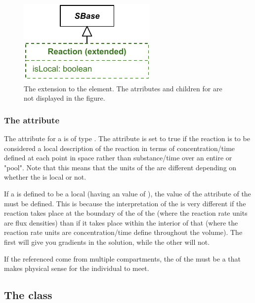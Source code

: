 \begin{figure}[ht]
  \includegraphics{figs/extended-reaction-uml}
  \caption{The extension to the \Reaction element. The \sbmlthreecore atrributes and children for \Reaction are not displayed in the figure.}
  \label{reaction-uml}
\end{figure}

\subsubsection{The \fixttspace{} attribute}
The  attribute for a \Reaction is of type . The attribute is set to true if the reaction is to be considered a local description of the reaction in terms of concentration/time defined at each point in space rather than substance/time over an entire \Compartment or "pool".  Note that this means that the units of the \KineticLaw are different depending on whether the \Reaction is local or not.

If a \Reaction is defined to be a local (having an  value of ), the value of the  attribute of the \Reaction must be defined.  This is because the interpretation of the \Reaction is very different if the reaction takes place at the boundary of the \Compartment of the \Species (where the reaction rate units are flux densities) than if it takes place within the interior of that \Compartment (where the reaction rate units are concentration/time define throughout the volume).  The first will give you gradients in the solution, while the other will not.

If the referenced \Species come from multiple compartments, the  of the \Reaction must be a \Compartment that makes physical sense for the individual \Species to meet.

\subsection{The  class}
\label{geometry-class}
\label{listofcoordinatecomponents-class}
\label{listofdomaintypes-class}
\label{listofdomains-class}
\label{listofadjacentdomains-class}
\label{listofgeometrydefinitions-class}
\label{listofsampledfields-class}

